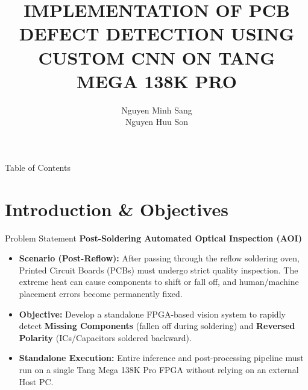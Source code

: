 \documentclass[t, aspectratio=169]{beamer}
\title{IMPLEMENTATION OF PCB DEFECT DETECTION USING CUSTOM CNN ON TANG MEGA 138K PRO}
\author{\texorpdfstring{Nguyen Minh Sang \\ Nguyen Huu Son}{Nguyen Minh Sang, Nguyen Huu Son}}
\institute{Viettel Manufacturing Coporation}
\begin{document}
	
	\husttitlepage
	
	\begin{frame}[allowframebreaks]{Table of Contents}
		\tableofcontents[hideallsubsections]
	\end{frame}
	
	\resetPageCount  
	\showPageNumber  
	
	\useStyleHustFull
	\useThinBar 
	
	\section{Introduction \& Objectives}
	
	\begin{frame}{Problem Statement}
		\textbf{Post-Soldering Automated Optical Inspection (AOI)}
		\begin{itemize}
			\item \textbf{Scenario (Post-Reflow):} After passing through the reflow soldering oven, Printed Circuit Boards (PCBs) must undergo strict quality inspection. The extreme heat can cause components to shift or fall off, and human/machine placement errors become permanently fixed.
			\item \textbf{Objective:} Develop a standalone FPGA-based vision system to rapidly detect \textbf{Missing Components} (fallen off during soldering) and \textbf{Reversed Polarity} (ICs/Capacitors soldered backward).
			\item \textbf{Standalone Execution:} Entire inference and post-processing pipeline must run on a single Tang Mega 138K Pro FPGA without relying on an external Host PC.
		\end{itemize}
	\end{frame}
	
\end{document}
